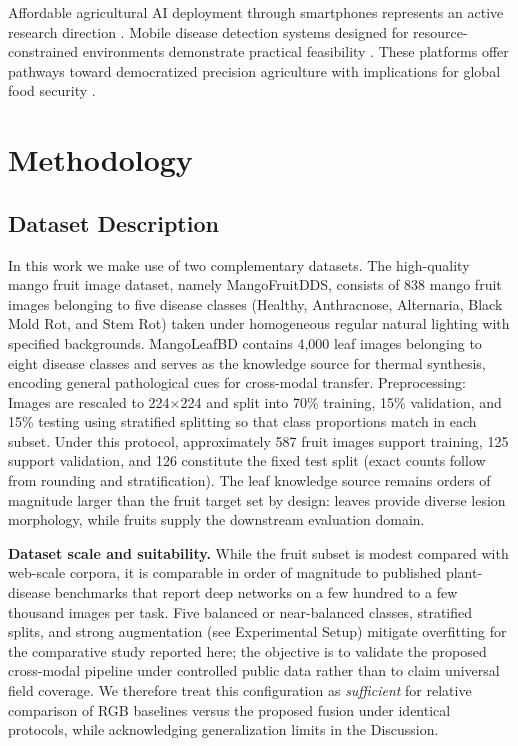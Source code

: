 \documentclass[conference]{IEEEtran}
\begin{document}
Affordable agricultural AI deployment through smartphones represents an active research direction \cite{pongnumkul2015}. Mobile disease detection systems designed for resource-constrained environments demonstrate practical feasibility \cite{li2020}. These platforms offer pathways toward democratized precision agriculture with implications for global food security \cite{liu2020_yolo}.

\section{Methodology}

\subsection{Dataset Description}
In this work we make use of two complementary datasets. The high-quality mango fruit image dataset, namely MangoFruitDDS, consists of 838 mango fruit images belonging to five disease classes (Healthy, Anthracnose, Alternaria, Black Mold Rot, and Stem Rot) taken under homogeneous regular natural lighting with specified backgrounds. MangoLeafBD contains 4,000 leaf images belonging to eight disease classes and serves as the knowledge source for thermal synthesis, encoding general pathological cues for cross-modal transfer.
Preprocessing: Images are rescaled to 224$\times$224 and split into 70\% training, 15\% validation, and 15\% testing using stratified splitting so that class proportions match in each subset. Under this protocol, approximately 587 fruit images support training, 125 support validation, and 126 constitute the fixed test split (exact counts follow from rounding and stratification). The leaf knowledge source remains orders of magnitude larger than the fruit target set by design: leaves provide diverse lesion morphology, while fruits supply the downstream evaluation domain.

\textbf{Dataset scale and suitability.} While the fruit subset is modest compared with web-scale corpora, it is comparable in order of magnitude to published plant-disease benchmarks that report deep networks on a few hundred to a few thousand images per task. Five balanced or near-balanced classes, stratified splits, and strong augmentation (see Experimental Setup) mitigate overfitting for the comparative study reported here; the objective is to validate the proposed cross-modal pipeline under controlled public data rather than to claim universal field coverage. We therefore treat this configuration as \emph{sufficient} for relative comparison of RGB baselines versus the proposed fusion under identical protocols, while acknowledging generalization limits in the Discussion.
\end{document}
